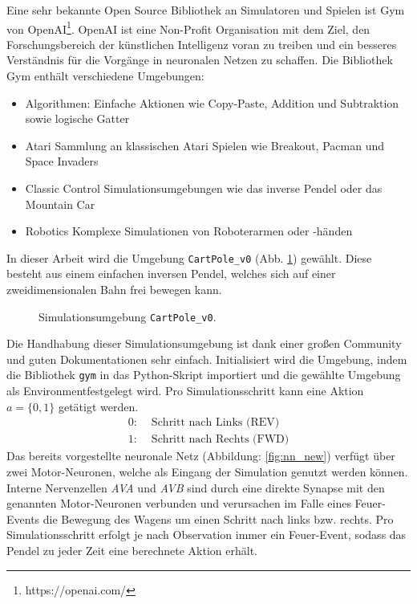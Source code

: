 	Eine sehr bekannte Open Source Bibliothek an Simulatoren und Spielen ist Gym von OpenAI\footnote{https://openai.com/}. OpenAI ist eine Non-Profit Organisation mit dem Ziel, den Forschungsbereich der künstlichen Intelligenz voran zu treiben und ein besseres Verständnis für die Vorgänge in neuronalen Netzen zu schaffen. Die Bibliothek Gym enthält verschiedene Umgebungen:
	\begin{itemize}
		\item Algorithmen:
		\subitem Einfache Aktionen wie Copy-Paste, Addition und Subtraktion sowie logische Gatter
		\item Atari
		\subitem Sammlung an klassischen Atari Spielen wie Breakout, Pacman und Space Invaders
		\item Classic Control
		\subitem Simulationsumgebungen wie das inverse Pendel oder das Mountain Car
		\item Robotics
		\subitem Komplexe Simulationen von Roboterarmen oder -händen
	\end{itemize}
	In dieser Arbeit wird die Umgebung \texttt{CartPole\_v0} (Abb. \ref{fig:imp_cartpole}) gewählt. Diese besteht aus einem einfachen inversen Pendel, welches sich auf einer zweidimensionalen Bahn frei bewegen kann.
	\begin{figure}[H]
		\centering
		\def\svgwidth{12cm}
		
		\caption{Simulationsumgebung \texttt{CartPole\_v0}.}
		\label{fig:imp_cartpole}
	\end{figure}
	Die Handhabung dieser Simulationsumgebung ist dank einer großen Community und guten Dokumentationen sehr einfach. Initialisiert wird die Umgebung, indem die Bibliothek \texttt{gym} in das Python-Skript importiert und die gewählte Umgebung als \glqq Environment\grqq{}festgelegt wird. Pro Simulationsschritt kann eine Aktion $a = \{0,1\}$ getätigt werden.
	\begin{align*}
		0 :& \text{ Schritt nach Links (REV)}\\
		1 :& \text{ Schritt nach Rechts (FWD)}
	\end{align*}
	Das bereits vorgestellte neuronale Netz (Abbildung: \ref{fig:nn_new}) verfügt über zwei Motor-Neuronen, welche als Eingang der Simulation genutzt werden können. Interne Nervenzellen \textit{AVA} und \textit{AVB} sind durch eine direkte Synapse mit den genannten Motor-Neuronen verbunden und verursachen im Falle eines Feuer-Events die Bewegung des Wagens um einen Schritt nach links bzw. rechts. Pro Simulationsschritt erfolgt je nach Observation immer ein Feuer-Event, sodass das Pendel zu jeder Zeit eine berechnete Aktion erhält.
